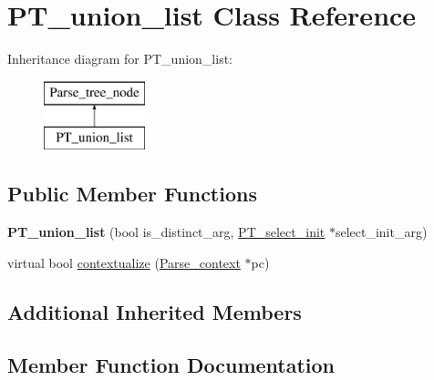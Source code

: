 \hypertarget{classPT__union__list}{}\section{P\+T\+\_\+union\+\_\+list Class Reference}
\label{classPT__union__list}
Inheritance diagram for P\+T\+\_\+union\+\_\+list\+:\begin{figure}[H]
\begin{center}
\leavevmode
\includegraphics[height=2.000000cm]{classPT__union__list}
\end{center}
\end{figure}
\subsection*{Public Member Functions}
\begin{DoxyCompactItemize}
\item 
\mbox{\label{classPT__union__list_aadb0fb0d510376d74bb1f4288656093c}} 
{\bfseries P\+T\+\_\+union\+\_\+list} (bool is\+\_\+distinct\+\_\+arg, \mbox{\hyperlink{classPT__select__init}{P\+T\+\_\+select\+\_\+init}} $\ast$select\+\_\+init\+\_\+arg)
\item 
virtual bool \mbox{\hyperlink{classPT__union__list_a9e569e01264b044adc28fb8ab68bed44}{contextualize}} (\mbox{\hyperlink{structParse__context}{Parse\+\_\+context}} $\ast$pc)
\end{DoxyCompactItemize}
\subsection*{Additional Inherited Members}


\subsection{Member Function Documentation}
\mbox{\label{classPT__union__list_a9e569e01264b044adc28fb8ab68bed44}} 
